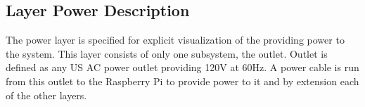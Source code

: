 \subsection{Layer Power Description}
The power layer is specified for explicit visualization of the providing power to the system. This layer consists of only one subsystem, the outlet. Outlet is defined as any US AC power outlet providing 120V at 60Hz. A power cable is run from this outlet to the Raspberry Pi to provide power to it and by extension each of the other layers. 